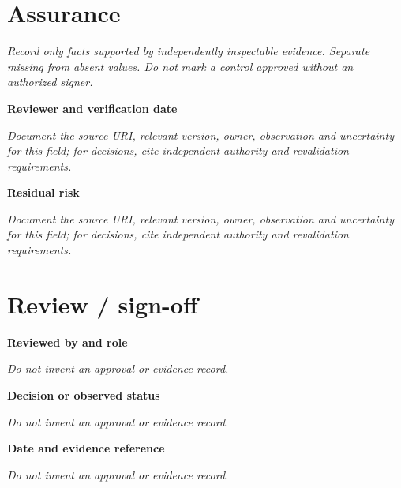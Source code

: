 \documentclass[11pt,letterpaper]{article}
\begin{document}
\section{Assurance}
\noindent\emph{Record only facts supported by independently inspectable evidence. Separate missing from absent values. Do not mark a control approved without an authorized signer.}\par
\noindent\textbf{Reviewer and verification date}\par
\noindent\emph{Document the source URI, relevant version, owner, observation and uncertainty for this field; for decisions, cite independent authority and revalidation requirements.}\par\medskip
\noindent\textbf{Residual risk}\par
\noindent\emph{Document the source URI, relevant version, owner, observation and uncertainty for this field; for decisions, cite independent authority and revalidation requirements.}\par\medskip
\section{Review / sign-off}
\noindent\textbf{Reviewed by and role}\par
\emph{Do not invent an approval or evidence record.}\par\medskip
\noindent\textbf{Decision or observed status}\par
\emph{Do not invent an approval or evidence record.}\par\medskip
\noindent\textbf{Date and evidence reference}\par
\emph{Do not invent an approval or evidence record.}\par\medskip
\end{document}
